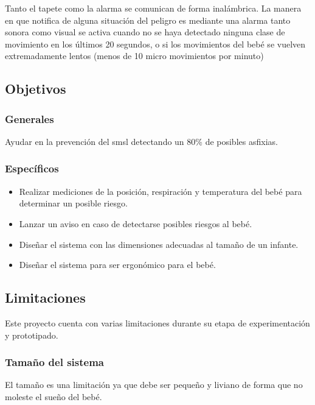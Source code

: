 Tanto el tapete como la alarma se comunican de forma inalámbrica.
La manera en que notifica de alguna situación del peligro es mediante una alarma tanto sonora como visual se activa cuando no se haya detectado ninguna clase de movimiento en los últimos 20 segundos, o si los movimientos del bebé se vuelven extremadamente lentos (menos de 10 micro movimientos por minuto)

\subsection{Objetivos}

\subsubsection{Generales}

Ayudar en la prevención del \acrlong{smsl} detectando un 80\% de posibles asfixias.

\subsubsection{Específicos}

\begin{itemize}
    \item Realizar mediciones de la posición, respiración y temperatura del bebé para determinar un posible riesgo.
    \item Lanzar un aviso en caso de detectarse posibles riesgos al bebé.
    \item Diseñar el sistema con las dimensiones adecuadas al tamaño de un infante.
    \item Diseñar el sistema para ser ergonómico para el bebé.
\end{itemize}

\subsection{Limitaciones}

Este proyecto cuenta con varias limitaciones durante su etapa de experimentación y prototipado.

\subsubsection{Tamaño del sistema}

El tamaño es una limitación ya que debe ser pequeño y liviano de forma que no moleste el sueño del bebé.

